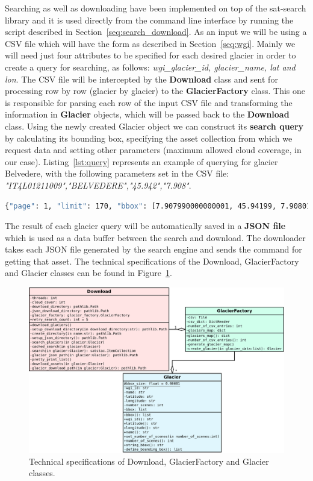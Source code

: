 \documentclass[11pt, a4paper]{report}
\begin{document}
	Searching as well as downloading have been implemented on top of the sat-search library and it is used directly from the command line interface by running the script described in Section~\ref{seq:search_download}.
	As an input we will be using a CSV file which will have the form as described in Section~\ref{seq:wgi}. Mainly we will need just four attributes to be specified for each desired glacier in order to create a query for searching, as follows: \textit{wgi\_glacier\_id, glacier\_name, lat and lon}.
	The CSV file will be intercepted by the \textbf{Download } class and sent for processing row by row (glacier by glacier) to the \textbf{GlacierFactory} class. This one is responsible for parsing each row of the input CSV file and transforming the information in \textbf{Glacier} objects, which will be passed back to the \textbf{Download} class.
	Using the newly created Glacier object we can construct its \textbf{search query} by calculating its bounding box, specifying the asset collection from which we request data and setting other parameters (maximum allowed cloud coverage, in our case). Listing~\ref{lst:query} represents an example of querying for glacier Belvedere, with the following parameters set in the CSV file: \textit{"IT4L01211009","BELVEDERE","45.942","7.908"}.
	\begin{lstlisting}[caption={Search query created by sat-search},label={lst:query},language=Bash]
		{"page": 1, "limit": 170, "bbox": [7.907990000000001, 45.94199, 7.90801, 45.94201], "query": {"eo:cloud_cover": {"lt": 10}}, "collection": "landsat-8-l1"}
	\end{lstlisting}
	The result of each glacier query will be automatically saved in a \textbf{JSON file} which is used as a data buffer between the search and download. The downloader takes each JSON file generated by the search engine and sends the command for getting that asset.
	The technical specifications of the Download, GlacierFactory and Glacier classes can be found in Figure~\ref{fig:sd_diagram}.
	\label{seq:sd_implementation}
	\begin{figure}[h]
		\centering
		\includegraphics[scale=0.23]{../images/sd_diagram.png}
		\caption{Technical specifications of Download, GlacierFactory and Glacier classes.}
		\label{fig:sd_diagram}
	\end{figure}
\end{document}

